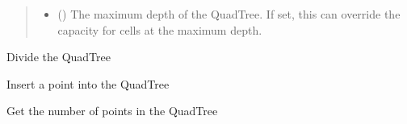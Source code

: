 \documentclass[letterpaper,10pt,english]{sphinxmanual}
\begin{document}
\begin{fulllineitems}
\begin{quote}
\begin{description}
\begin{itemize}
\item {}
\sphinxAtStartPar
{} (\sphinxstyleliteralemphasis{\sphinxupquote{ | }}) \textendash{} The maximum depth of the QuadTree. If set, this can override the
capacity for cells at the maximum depth.

\end{itemize}

\end{description}\end{quote}

\begin{fulllineitems}
\label{\detokenize{quadtree:geotrees.quadtree.QuadTree.divide}}
\pysigstartsignatures
\pysiglinewithargsret
{}
{}
{}
\pysigstopsignatures
\sphinxAtStartPar
Divide the QuadTree

\end{fulllineitems}


\begin{fulllineitems}
\label{\detokenize{quadtree:geotrees.quadtree.QuadTree.insert}}
\pysigstartsignatures
\pysiglinewithargsret
{}
{}
{}
\pysigstopsignatures
\sphinxAtStartPar
Insert a point into the QuadTree
\begin{quote}\begin{description}
\sphinxAtStartPar
{}

\end{description}\end{quote}

\end{fulllineitems}


\begin{fulllineitems}
\label{\detokenize{quadtree:geotrees.quadtree.QuadTree.len}}
\pysigstartsignatures
\pysiglinewithargsret
{}
{}
{}
\pysigstopsignatures
\sphinxAtStartPar
Get the number of points in the QuadTree
\begin{quote}\begin{description}
\sphinxAtStartPar
{}


\end{description}
\end{quote}
\end{fulllineitems}
\end{fulllineitems}
\end{document}
